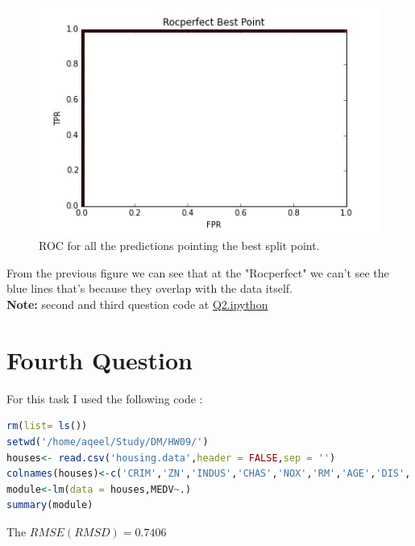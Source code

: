 \documentclass{article}
\begin{document}
\begin{figure}[H]
	\begin{center}
		\includegraphics[scale=0.58]{rocperfect_best.jpg}
	\end{center}
	
	\caption{ROC for all the predictions pointing the best split point.}
\end{figure}
From the previous figure we can see that at the "Rocperfect" we can't see the blue lines that's because they overlap with the data itself.\\
\textbf{Note: }second and third question code at \href{https://github.com/aqeel13932/DM/blob/master/HW09/roc_data/Q2.ipynb}{Q2.ipython} 
\section*{Fourth Question}
For this task I used the following code : 
\begin{lstlisting}[language=R]
rm(list= ls())
setwd('/home/aqeel/Study/DM/HW09/')
houses<- read.csv('housing.data',header = FALSE,sep = '')
colnames(houses)<-c('CRIM','ZN','INDUS','CHAS','NOX','RM','AGE','DIS','RAD','TAX','PTRATIO','B','LSTAT','MEDV')
module<-lm(data = houses,MEDV~.)
summary(module)
\end{lstlisting}
The \(RMSE (RMSD) = 0.7406\)
\end{document}
